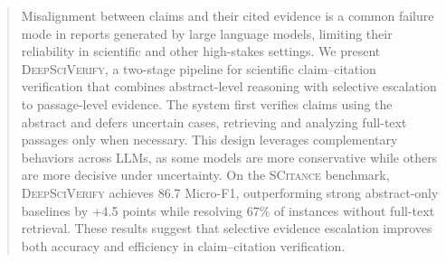 \documentclass{article}
\theoremstyle{plain}
\theoremstyle{definition}
\theoremstyle{remark}
\begin{document}




\begin{abstract}
    Misalignment between claims and their cited evidence is a common failure mode in reports generated by large language models, limiting their reliability in scientific and other high-stakes settings. We present \textsc{DeepSciVerify}, a two-stage pipeline for scientific claim--citation verification that combines abstract-level reasoning with selective escalation to passage-level evidence. The system first verifies claims using the abstract and defers uncertain cases, retrieving and analyzing full-text passages only when necessary. This design leverages complementary behaviors across LLMs, as some models are more conservative while others are more decisive under uncertainty. On the \textsc{SCitance} benchmark, \textsc{DeepSciVerify} achieves 86.7 Micro-F1, outperforming strong abstract-only baselines by +4.5 points while resolving 67\% of instances without full-text retrieval. These results suggest that selective evidence escalation improves both accuracy and efficiency in claim--citation verification. 
\end{abstract}
\end{document}

